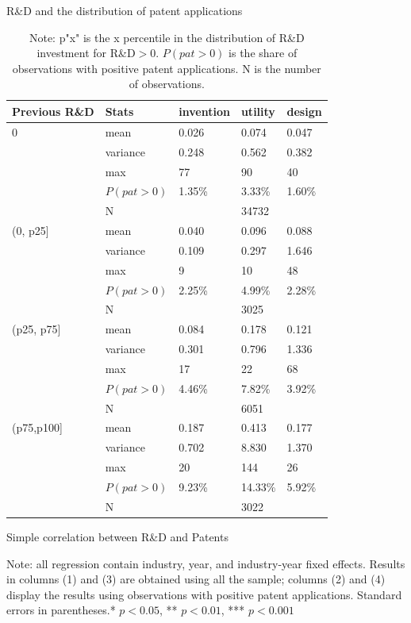 \documentclass[english]{article}
\begin{document}
\begin{table}[H]
\centering
\caption{R\&D and the distribution of patent applications}
\label{T4}
\begin{tabular}{lllll}
\hline\hline 
Previous R\&D & Stats  & invention  & utility  & design \\
\hline\hline 
 0    &mean     & 0.026  & 0.074   & 0.047  \\
      &variance & 0.248  & 0.562   & 0.382  \\
      &max      & 77     & 90      & 40     \\
      &  $P(pat>0)$    & 1.35\% & 3.33\%  & 1.60\% \\
      &N        &   & 34732   &   \\
      \hline
(0, p25]     & mean     & 0.040  & 0.096   & 0.088  \\
        & variance & 0.109  & 0.297   & 1.646  \\
      & max      & 9      & 10      & 48     \\
      &  $P(pat>0)$   & 2.25\% & 4.99\%  & 2.28\% \\
      & N        &    & 3025   &   \\
      \hline 
(p25, p75]   & mean     & 0.084  & 0.178   & 0.121  \\
      & variance & 0.301  & 0.796   & 1.336  \\
      & max      & 17     & 22      & 68     \\
      &  $P(pat>0)$   & 4.46\% & 7.82\%  & 3.92\% \\
      & N        &    & 6051    &   \\
      \hline
(p75,p100]    &mean & 0.187  & 0.413   & 0.177  \\
      & variance & 0.702  & 8.830   & 1.370  \\
      & max      & 20    & 144     & 26     \\
      &  $P(pat>0)$   & 9.23\% & 14.33\% & 5.92\% \\
      & N        &    & 3022    &  \\
\hline\hline
\end{tabular}
\caption*{\small{}Note: p"x" is the x percentile in the distribution of R\&D investment for R\&D$>$0. $P(pat>0)$ is the share of observations with positive patent applications. N is the number of observations.}{\small \par}
\end{table}



\begin{table}[H]
\centering
\caption{Simple correlation between R\&D and Patents}
\label{T5A}

\caption*{\small{}Note: all regression contain industry, year, and industry-year fixed effects. Results in columns (1) and (3) are obtained using all the sample; columns (2) and (4) display the results using observations with positive patent applications. Standard errors in parentheses.{*} \(p<0.05\), {**} \(p<0.01\), {***} \(p<0.001\)} {\small \par}
\end{table}
\end{document}
